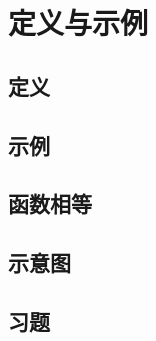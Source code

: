 \section{定义与示例}

\subsection{定义}

\subsection{示例}

\subsection{函数相等}

\subsection{示意图}

\subsection{习题}